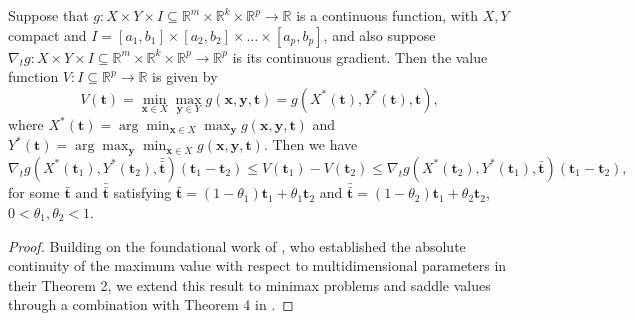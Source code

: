 \documentclass[12pt]{article}
\begin{document}
\begin{lemma}
\label{lemma:sd_dif}
Suppose that $g:X\times Y \times I \subseteq \mathbb{R}^m \times \mathbb{R}^k \times \mathbb{R}^p \rightarrow \mathbb{R}$ is a continuous function, with $X,Y$ compact and $I = [a_1,b_1]\times[a_2,b_2]\times \dots \times [a_p,b_p]$, and also suppose ${\nabla_t} g:X\times Y \times I \subseteq \mathbb{R}^m \times \mathbb{R}^k \times \mathbb{R}^p \rightarrow \mathbb{R}^p$ is its continuous gradient. Then the value function $V:I\subseteq\mathbb{R}^p \rightarrow \mathbb{R}$ is given by
\begin{equation*}
    V(\bm{t})=\min_{\bm{x}\in X} \max_{\bm{y}\in Y}g(\bm{x},\bm{y},\bm{t}) = g(X^\ast(\bm{t}),Y^\ast(\bm{t}),\bm{t}),
\end{equation*}
where $X^\ast(\bm{t})=\arg\min_{\bm{x}\in X} \max_{\bm{y}}g(\bm{x},\bm{y},\bm{t})$ and $Y^\ast(\bm{t})=\arg \max_{\bm{y}}\min_{\bm{x}\in X} g(\bm{x},\bm{y},\bm{t})$. Then we have
\begin{equation}
    \nabla_tg(X^\ast(\bm{t}_1),Y^\ast(\bm{t}_2),\bar{\bar{\bm{t}}})(\bm{t}_1-\bm{t}_2) \le V(\bm{t}_1) - V(\bm{t}_2) \le \nabla_tg(X^\ast(\bm{t}_2),Y^\ast(\bm{t}_1),\bar{\bm{t}})(\bm{t}_1-\bm{t}_2),
\end{equation}
for some $\bar{\bm{t}}$ and $\bar{\bar{\bm{t}}}$ satisfying $\bar{\bm{t}} = 
(1-\theta_1)\bm{t}_1+\theta_1\bm{t}_2$ and $\bar{\bar{\bm{t}}} = 
(1-\theta_2)\bm{t}_1+\theta_2\bm{t}_2$, $0<\theta_1,\theta_2<1$.

\begin{proof}
Building on the foundational work of \citet{de2009general}, who established the absolute continuity of the maximum value with respect to multidimensional parameters in their Theorem 2, we extend this result to minimax problems and saddle values through a combination with Theorem 4 in \citet{milgrom2002envelope}.


\end{proof}
\end{lemma}
\end{document}
